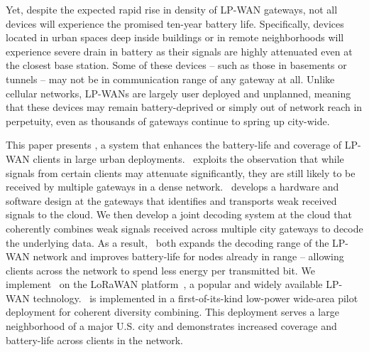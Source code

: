
Yet, despite the expected rapid rise in density of LP-WAN gateways, not all devices will experience the promised ten-year battery life. Specifically, devices located in urban spaces deep inside buildings or in remote neighborhoods will experience severe drain in battery as their signals are highly attenuated even at the closest base station. Some of these devices -- such as those in basements or tunnels -- may not be in communication range of any gateway at all. Unlike cellular networks, LP-WANs are largely user deployed and unplanned, meaning that these devices may remain battery-deprived or simply out of network reach in perpetuity, even as thousands of gateways continue to spring up city-wide.  



This paper presents \name, a system that enhances the battery-life and
coverage of LP-WAN clients in large urban deployments. \name\ exploits the
observation that while signals from certain clients may attenuate significantly, they are still likely to be received by multiple gateways in a dense network. \name\ develops a hardware and software design at the gateways that identifies and transports weak received signals to the cloud. We then develop a joint decoding system at the cloud that coherently
combines weak signals received across multiple city gateways to decode the underlying data. As a result, \name\ both expands the decoding range of the LP-WAN network and improves battery-life for nodes already in range -- allowing clients across the network to spend less energy per transmitted bit. We implement \name\ on the LoRaWAN platform~\cite{LoRaWanAlliance2015}, a popular and widely available LP-WAN technology. \name\ is
implemented in a first-of-its-kind low-power wide-area pilot deployment for
coherent diversity combining. This deployment serves a large neighborhood of a major U.S. city and
demonstrates increased coverage and battery-life across clients in the network.



